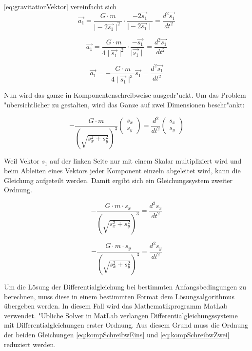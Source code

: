 \begin{refsection}
\ref{eq:gravitationVektor} vereinfacht sich 
\begin{equation}
\vec{a_1} =\frac{G \cdot m}{\mid -2\vec{s_{1}}\mid ^2}\cdot \frac{-2\vec{s_{1}}}{\mid -2\vec{s_{1}}\mid}=  \frac{d^2 \vec{s_1}}{dt^2}
\end{equation}

\begin{equation}
\vec{a_1} =\frac{G \cdot m}{4\mid \vec{s_{1}}\mid ^2}\cdot \frac{-\vec{s_{1}}}{\mid \vec{s_{1}}\mid}=  \frac{d^2 \vec{s_1}}{dt^2}
\end{equation}

\begin{equation}
\vec{a_1} =-\frac{G \cdot m}{4\mid \vec{s_{1}}\mid ^3}{\vec{s_{1}}}= \frac{d^2 \vec{s_1}}{dt^2}
\end{equation}


Nun wird das ganze in Komponentenschreibweise ausgedr"uckt.
Um das Problem "ubersichtlicher zu gestalten, wird das Ganze auf zwei Dimensionen beschr"ankt:

\begin{equation}
-\frac{G \cdot m}{(\sqrt{s_x^2 + s_y^2})^3}
\begin{pmatrix}
s_x \\ s_y
\end{pmatrix}
=\frac{d^2}{dt^2}
\begin{pmatrix}
s_x \\ s_y
\end{pmatrix}
\end{equation}

Weil Vektor $s_1$ auf der linken Seite nur mit einem Skalar multipliziert wird und beim Ableiten eines Vektors jeder Komponent einzeln abgeleitet wird, kann die Gleichung aufgeteilt werden.
Damit ergibt sich ein Gleichungssystem zweiter Ordnung.

\begin{equation} \label{eq:kompSchreibwEins}
-\frac{G \cdot m \cdot s_x}{(\sqrt{s_x^2 + s_y^2})^3} = \frac{d^2s_x}{dt^2}
\end{equation}

\begin{equation} \label{eq:kompSchreibwZwei}
-\frac{G \cdot m \cdot s_y}{(\sqrt{s_x^2 + s_y^2})^3} = \frac{d^2s_y}{dt^2}
\end{equation}

Um die Lösung der Differentialgleichung bei bestimmten Anfangsbedingungen zu berechnen, muss diese in einem bestimmten Format dem Lösungsalgorithmus übergeben werden.
In diesem Fall wird das Mathematikprogramm MatLab verwendet. 
"Ubliche Solver in MatLab verlangen Differentialgleichungssysteme mit Differentialgleichungen erster Ordnung.
Aus diesem Grund muss die Ordnung der beiden Gleichungen \ref{eq:kompSchreibwEins} und \ref{eq:kompSchreibwZwei} reduziert werden.


\end{refsection}
